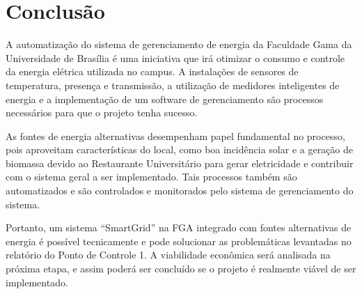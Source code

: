 \chapter*[Conclusão]{Conclusão}

A automatização do sistema de gerenciamento de energia da Faculdade Gama da Universidade de Brasília é uma iniciativa que irá otimizar o consumo e controle da energia elétrica utilizada no campus. A instalações de sensores de temperatura, presença e transmissão, a utilização de medidores inteligentes de energia e a implementação de um software de gerenciamento são processos necessários para que o projeto tenha sucesso.

As fontes de energia alternativas desempenham papel fundamental no processo, pois aproveitam características do local, como boa incidência solar e a geração de biomassa devido ao Restaurante Universitário para gerar eletricidade e contribuir com o sistema geral a ser implementado. Tais processos também são automatizados e são controlados e monitorados pelo sistema de gerenciamento do sistema. 

Portanto, um sistema ``SmartGrid'' na FGA integrado com fontes alternativas de energia é possível tecnicamente e pode solucionar as problemáticas levantadas no relatório do Ponto de Controle 1. A viabilidade econômica será analisada na próxima etapa, e assim poderá ser concluído se o projeto é realmente viável de ser implementado.
